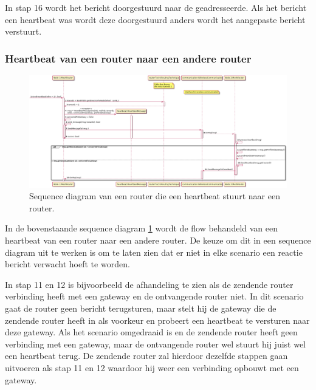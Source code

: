 \documentclass[a4paper, 11pt, oneside]{report}
\begin{document}
In stap 16 wordt het bericht doorgestuurd naar de geadresseerde.
Als het bericht een heartbeat was wordt deze doorgestuurd anders wordt het aangepaste bericht verstuurt.

\subsubsection{Heartbeat van een router naar een andere router}
\label{DetailedDesign:Communicatie:sequence:heartbeatrouter->router}
\begin{figure}[H]
	\begin{center}\includegraphics[width=\linewidth]{UML/out/Communication/Sequence/RouterHeartbeatRouter/RouterHeartbeatRouter.png}\end{center}
	\caption{Sequence diagram van een router die een heartbeat stuurt naar een router.}
	\label{fig:communication:sequence:sequence:router->router}
\end{figure}
In de bovenstaande sequence diagram \ref{fig:communication:sequence:sequence:router->router} wordt de flow behandeld van een heartbeat van een router naar een andere router.
De keuze om dit in een sequence diagram uit te werken is om te laten zien dat er niet in elke scenario een reactie bericht verwacht hoeft te worden.

In stap 11 en 12 is bijvoorbeeld de afhandeling te zien als de zendende router verbinding heeft met een gateway en de ontvangende router niet.
In dit scenario gaat de router geen bericht terugsturen, maar stelt hij de gateway die de zendende router heeft in als voorkeur en probeert een heartbeat te versturen naar deze gateway.    
Als het scenario omgedraaid is en de zendende router heeft geen verbinding met een gateway, maar de ontvangende router wel stuurt hij juist wel een heartbeat terug. 
De zendende router zal hierdoor dezelfde stappen gaan uitvoeren als stap 11 en 12 waardoor hij weer een verbinding opbouwt met een gateway.
\end{document}
